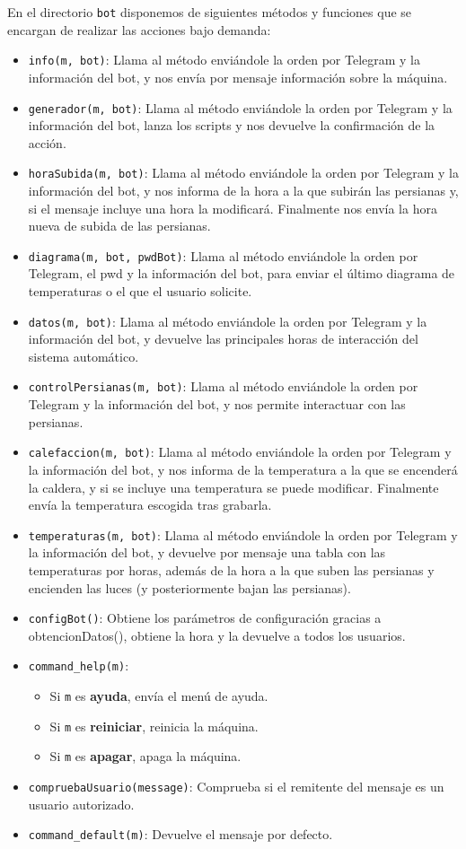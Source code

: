 En el directorio \texttt{bot} disponemos de siguientes métodos y funciones que se encargan de realizar las acciones bajo demanda:
\begin{itemize}
    \item \texttt{info(m, bot)}: Llama al método enviándole la orden por Telegram y la información del bot, y nos envía por mensaje información sobre la máquina.
    \item \texttt{generador(m, bot)}: Llama al método enviándole la orden por Telegram y la información del bot, lanza los scripts y nos devuelve la confirmación de la acción.
    \item \texttt{horaSubida(m, bot)}: Llama al método enviándole la orden por Telegram y la información del bot, y nos informa de la hora a la que subirán las persianas y, si el mensaje incluye una hora la modificará. Finalmente nos envía la hora nueva de subida de las persianas.
    \item \texttt{diagrama(m, bot, pwdBot)}: Llama al método enviándole la orden por Telegram, el pwd y la información del bot, para enviar el último diagrama de temperaturas o el que el usuario solicite.
    \item \texttt{datos(m, bot)}: Llama al método enviándole la orden por Telegram y la información del bot, y devuelve las principales horas de interacción del sistema automático.
    \item \texttt{controlPersianas(m, bot)}: Llama al método enviándole la orden por Telegram y la información del bot, y nos permite interactuar con las persianas.
    \item \texttt{calefaccion(m, bot)}: Llama al método enviándole la orden por Telegram y la información del bot, y nos informa de la temperatura a la que se encenderá la caldera, y si se incluye una temperatura se puede modificar. Finalmente envía la temperatura escogida tras grabarla.
    \item \texttt{temperaturas(m, bot)}: Llama al método enviándole la orden por Telegram y la información del bot, y devuelve por mensaje una tabla con las temperaturas por horas, además de la hora a la que suben las persianas y encienden las luces (y posteriormente bajan las persianas).
    \item \texttt{configBot()}: Obtiene los parámetros de configuración gracias a obtencionDatos(), obtiene la hora y la devuelve a todos los usuarios.
        \item \texttt{command\_help(m)}:
    \begin{itemize}
        \item Si \texttt{m} es \textbf{ayuda}, envía el menú de ayuda.
        \item Si \texttt{m} es \textbf{reiniciar}, reinicia la máquina.
        \item Si \texttt{m} es \textbf{apagar}, apaga la máquina.
    \end{itemize}
    \item \texttt{compruebaUsuario(message)}: Comprueba si el remitente del mensaje es un usuario autorizado.
    \item \texttt{command\_default(m)}: Devuelve el mensaje por defecto.
\end{itemize}
